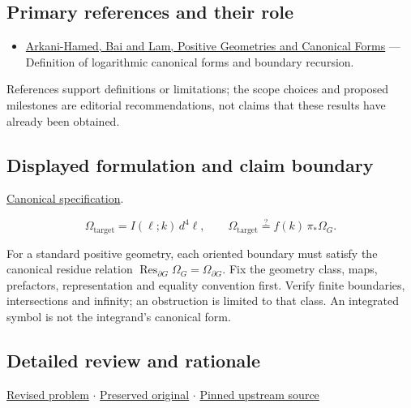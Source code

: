 \documentclass[
  11pt,
]{article}
\providecommand{\tightlist}{%
  \setlength{\itemsep}{0pt}\setlength{\parskip}{0pt}}
\begin{document}
\subsection{Primary references and their role}

\begin{itemize}
\tightlist
\item
  \href{https://arxiv.org/abs/1703.04541}{Arkani-Hamed, Bai and Lam,
  Positive Geometries and Canonical Forms} --- Definition of logarithmic
  canonical forms and boundary recursion.
\end{itemize}

References support definitions or limitations; the scope choices and
proposed milestones are editorial recommendations, not claims that these
results have already been obtained.

\subsection{Displayed formulation and claim boundary}

\href{https://github.com/rick-stevens-ai/Pure-Thought/blob/main/PRDs/05-Positive-Geometry-Gravity.md}{Canonical
specification}.

\[\Omega_{\mathrm{target}}=I(\ell;k)\,d^4\ell,
\qquad \Omega_{\mathrm{target}}\stackrel{?}{=}f(k)\,\pi_*\Omega_G.\]

For a standard positive geometry, each oriented boundary must satisfy
the canonical residue relation
\(\operatorname{Res}_{\partial G}\Omega_G=\Omega_{\partial G}\). Fix the
geometry class, maps, prefactors, representation and equality convention
first. Verify finite boundaries, intersections and infinity; an
obstruction is limited to that class. An integrated symbol is not the
integrand's canonical form.

\subsection{Detailed review and rationale}

\href{https://github.com/rick-stevens-ai/Pure-Thought/blob/main/PRDs/05-Positive-Geometry-Gravity.md}{Revised
problem} \ensuremath{\cdot}
\href{https://github.com/rick-stevens-ai/Pure-Thought/blob/main/archive/original-PRDs/05-Positive-Geometry-Gravity.md}{Preserved
original} \ensuremath{\cdot}
\href{https://github.com/rick-stevens-ai/Pure-Thought/blob/f854d4e12b55c1f5b5c2a964b75f2d23496d981e/PRDs/05-Positive-Geometry-Gravity.md}{Pinned
upstream source}
\end{document}
